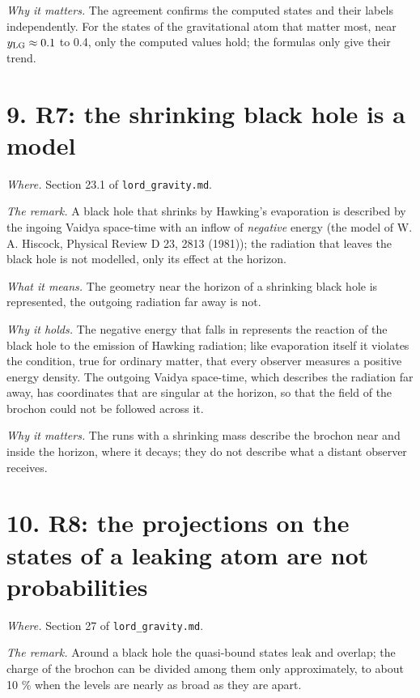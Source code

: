 \documentclass[
  10pt,
]{article}
\begin{document}
\emph{Why it matters.} The agreement confirms the computed states and
their labels independently. For the states of the gravitational atom
that matter most, near \(y_{\rm LG}\approx0.1\) to 0.4, only the
computed values hold; the formulas only give their trend.

\hypertarget{r7-the-shrinking-black-hole-is-a-model}{%
\section{9. R7: the shrinking black hole is a
model}\label{r7-the-shrinking-black-hole-is-a-model}}

\emph{Where.} Section 23.1 of \texttt{lord\_gravity.md}.

\emph{The remark.} A black hole that shrinks by Hawking's evaporation is
described by the ingoing Vaidya space-time with an inflow of
\emph{negative} energy (the model of W. A. Hiscock, Physical Review D
23, 2813 (1981)); the radiation that leaves the black hole is not
modelled, only its effect at the horizon.

\emph{What it means.} The geometry near the horizon of a shrinking black
hole is represented, the outgoing radiation far away is not.

\emph{Why it holds.} The negative energy that falls in represents the
reaction of the black hole to the emission of Hawking radiation; like
evaporation itself it violates the condition, true for ordinary matter,
that every observer measures a positive energy density. The outgoing
Vaidya space-time, which describes the radiation far away, has
coordinates that are singular at the horizon, so that the field of the
brochon could not be followed across it.

\emph{Why it matters.} The runs with a shrinking mass describe the
brochon near and inside the horizon, where it decays; they do not
describe what a distant observer receives.

\hypertarget{r8-the-projections-on-the-states-of-a-leaking-atom-are-not-probabilities}{%
\section{10. R8: the projections on the states of a leaking atom are not
probabilities}\label{r8-the-projections-on-the-states-of-a-leaking-atom-are-not-probabilities}}

\emph{Where.} Section 27 of \texttt{lord\_gravity.md}.

\emph{The remark.} Around a black hole the quasi-bound states leak and
overlap; the charge of the brochon can be divided among them only
approximately, to about 10 \% when the levels are nearly as broad as
they are apart.
\end{document}
